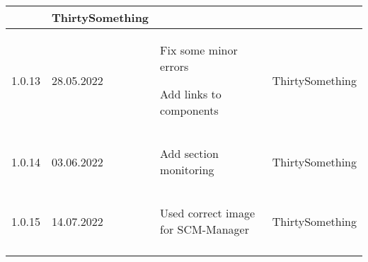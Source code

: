 \begin{tiny}
\begin{longtable}{ | p{} | p{} | P{0.49\textwidth} | p{0.15\textwidth} | }
\begin{tsLTItemize}
        \end{tsLTItemize}
                                 &
        ThirtySomething            \\
        \hline
        1.0.13                   &
        28.05.2022               &
        \begin{tsLTItemize}
            \item Fix some minor errors
            \item Add links to components
        \end{tsLTItemize}
                                 &
        ThirtySomething            \\
        \hline
        1.0.14                   &
        03.06.2022               &
        \begin{tsLTItemize}
            \item Add section monitoring
        \end{tsLTItemize}
                                 &
        ThirtySomething            \\
        \hline
        1.0.15                   &
        14.07.2022               &
        \begin{tsLTItemize}
            \item Used correct image for SCM-Manager
        \end{tsLTItemize}
                                 &
        ThirtySomething            \\
        \hline
    \end{longtable}
\end{tiny}
